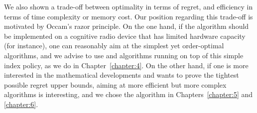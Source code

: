 \clearpage

We also shown a trade-off between optimality in terms of regret, and efficiency in terms of time complexity or memory cost.
Our position regarding this trade-off is motivated by Occam's razor principle.
On the one hand, if the algorithm should be implemented on a cognitive radio device that has limited hardware capacity (for instance),
one can reasonably aim at the simplest yet order-optimal algorithms, and we advise to use \UCB{} and algorithms running on top of this simple index policy, as we do in Chapter~\ref{chapter:4}.
On the other hand, if one is more interested in the mathematical developments and wants to prove the tightest possible regret upper bounds, aiming at more efficient but more complex algorithms is interesting, and we chose the \klUCB{} algorithm in Chapters~\ref{chapter:5} and \ref{chapter:6}.











